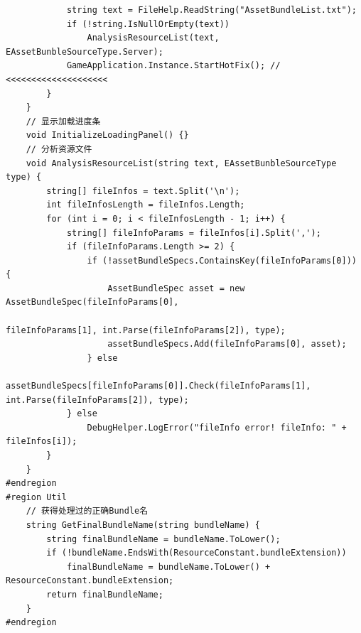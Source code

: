 \documentclass[9pt, b5paper]{article}
\begin{document}
\begin{verbatim}
            string text = FileHelp.ReadString("AssetBundleList.txt");
            if (!string.IsNullOrEmpty(text)) 
                AnalysisResourceList(text, EAssetBunbleSourceType.Server);
            GameApplication.Instance.StartHotFix(); // <<<<<<<<<<<<<<<<<<<< 
        }
    }
    // 显示加载进度条
    void InitializeLoadingPanel() {}
    // 分析资源文件
    void AnalysisResourceList(string text, EAssetBunbleSourceType type) {
        string[] fileInfos = text.Split('\n');
        int fileInfosLength = fileInfos.Length;
        for (int i = 0; i < fileInfosLength - 1; i++) {
            string[] fileInfoParams = fileInfos[i].Split(',');
            if (fileInfoParams.Length >= 2) {
                if (!assetBundleSpecs.ContainsKey(fileInfoParams[0])) {
                    AssetBundleSpec asset = new AssetBundleSpec(fileInfoParams[0],
                                                                fileInfoParams[1], int.Parse(fileInfoParams[2]), type);
                    assetBundleSpecs.Add(fileInfoParams[0], asset);
                } else 
                    assetBundleSpecs[fileInfoParams[0]].Check(fileInfoParams[1], int.Parse(fileInfoParams[2]), type);
            } else 
                DebugHelper.LogError("fileInfo error! fileInfo: " + fileInfos[i]);
        }
    }
#endregion
#region Util
    // 获得处理过的正确Bundle名
    string GetFinalBundleName(string bundleName) {
        string finalBundleName = bundleName.ToLower();
        if (!bundleName.EndsWith(ResourceConstant.bundleExtension)) 
            finalBundleName = bundleName.ToLower() + ResourceConstant.bundleExtension;
        return finalBundleName;
    }
#endregion


\end{verbatim}
\end{document}
